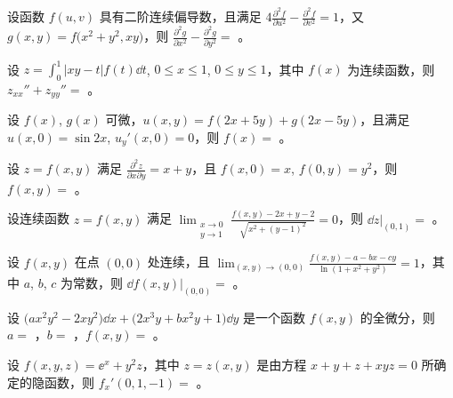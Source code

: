 \begin{ti}
	设函数 $f(u,v)$ 具有二阶连续偏导数，且满足 $4 \frac{\partial^2f}{\partial u^2} - \frac{\partial^2f}{\partial v^2} = 1$，又 $g(x,y) = f\bigl(x^2 + y^2,xy \bigr)$，则 $\frac{\partial^2g}{\partial x^2} - \frac{\partial^2g}{\partial y^2} = $ \hua。
\end{ti}

\begin{ti}
	设 $z = \int_0^1 |xy - t| f(t) \dd{t}$, $0 \leq x \leq 1$, $0 \leq y \leq 1$，其中 $f(x)$ 为连续函数，则 $z_{xx}'' + z_{yy}'' = $ \hua。
\end{ti}

\begin{ti}
	设 $f(x)$, $g(x)$ 可微，$u(x,y) = f(2x+5y) + g(2x-5y)$，且满足 $u(x,0) = \sin 2x$, $u_y'(x,0) = 0$，则 $f(x) = $ \hua。
\end{ti}

\begin{ti}
	设 $z = f(x,y)$ 满足 $\frac{\partial^2z}{\partial x \partial y} = x + y$，且 $f(x,0) = x$, $f(0,y) = y^2$，则 $f(x,y) = $ \hua。
\end{ti}

\begin{ti}
	设连续函数 $z = f(x,y)$ 满足 $\lim_{\substack{x \to 0\\y \to 1}} \frac{f(x,y) - 2x + y - 2}{\sqrt{x^2 + (y-1)^2}} = 0$，则 $\dd{z}|_{(0,1)} = $ \hua。
\end{ti}

\begin{ti}
	设 $f(x,y)$ 在点 $(0,0)$ 处连续，且 $\lim_{(x,y) \to (0,0)} \frac{f(x,y) - a - bx - cy}{\ln(1 + x^2 + y^2)} = 1$，其中 $a$, $b$, $c$ 为常数，则 $\dd{f(x,y)}|_{(0,0)} = $ \hua。
\end{ti}

\begin{ti}
	设 $\bigl( ax^2 y^2 - 2xy^2 \bigr) \dd{x} + \bigl( 2x^3 y + bx^2 y + 1 \bigr) \dd{y}$ 是一个函数 $f(x,y)$ 的全微分，则 $a = $ \hua，$b = $ \hua，$f(x,y) = $ \hua。
\end{ti}

\begin{ti}
	设 $f(x,y,z) = \ee^x + y^2 z$，其中 $z = z(x,y)$ 是由方程 $x + y + z + xyz = 0$ 所确定的隐函数，则 $f_x'(0,1,-1) = $ \hua。
\end{ti}